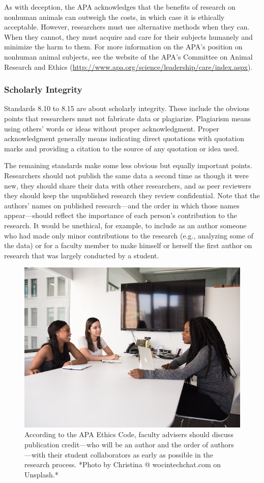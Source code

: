 \documentclass[
]{krantz}
\begin{document}
As with deception, the APA acknowledges that the benefits of research on nonhuman animals can outweigh the costs, in which case it is ethically acceptable. However, researchers must use alternative methods when they can. When they cannot, they must acquire and care for their subjects humanely and minimize the harm to them. For more information on the APA's position on nonhuman animal subjects, see the website of the APA's Committee on Animal Research and Ethics (\url{http://www.apa.org/science/leadership/care/index.aspx}).

\hypertarget{scholarly-integrity}{%
\subsubsection*{Scholarly Integrity}\label{scholarly-integrity}}


Standards 8.10 to 8.15 are about scholarly integrity. These include the obvious points that researchers must not fabricate data or plagiarize. Plagiarism means using others' words or ideas without proper acknowledgment. Proper acknowledgment generally means indicating direct quotations with quotation marks and providing a citation to the source of any quotation or idea used.

The remaining standards make some less obvious but equally important points. Researchers should not publish the same data a second time as though it were new, they should share their data with other researchers, and as peer reviewers they should keep the unpublished research they review confidential. Note that the authors' names on published research---and the order in which those names appear---should reflect the importance of each person's contribution to the research. It would be unethical, for example, to include as an author someone who had made only minor contributions to the research (e.g., analyzing some of the data) or for a faculty member to make himself or herself the first author on research that was largely conducted by a student.

\begin{figure}

{\centering \includegraphics[width=0.5\linewidth]{images/ethics/authorship} 

}

\caption{According to the APA Ethics Code, faculty advisers should discuss publication credit—who will be an author and the order of authors—with their student collaborators as early as possible in the research process. *Photo by Christina @ wocintechchat.com on Unsplash.*}\label{fig:authorship}
\end{figure}
\end{document}
